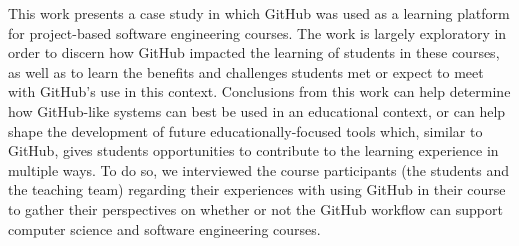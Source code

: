 

This work presents a case study in which GitHub was used as a learning platform for project-based software engineering courses. The work is largely exploratory in order to discern how GitHub impacted the learning of students in these courses, as well as to learn the benefits and challenges students met or expect to meet with GitHub's use in this context. Conclusions from this work can help determine how GitHub-like systems can best be used in an educational context, or can help shape the development of future educationally-focused tools which, similar to GitHub, gives students opportunities to contribute to the learning experience in multiple ways. To do so, we interviewed the course participants (the students and the teaching team) regarding their experiences with using GitHub in their course to gather their perspectives on whether or not the GitHub workflow can support computer science and software engineering courses.

